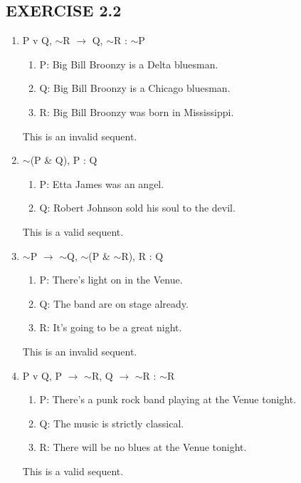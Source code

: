 \documentclass[a4paper,12pt]{article}
\newcommand{\ra}{$\rightarrow$ }
\newcommand{\s}{$\sim$}
\begin{document}
    \subsection*{EXERCISE 2.2}

    \begin{enumerate}[label=\arabic*,leftmargin=*]

        \item P v Q, \s R \ra Q, \s R : \s P
            \nopagebreak
            \begin{enumerate}[label=(\roman*)]
                \item P: Big Bill Broonzy is a Delta bluesman.
                \item Q: Big Bill Broonzy is a Chicago bluesman.
                \item R: Big Bill Broonzy was born in Mississippi.
            \end{enumerate}
            This is an invalid sequent.

        \item \s (P \& Q), P : Q
            \nopagebreak
            \begin{enumerate}[label=(\roman*)]
                \item P: Etta James was an angel.
                \item Q: Robert Johnson sold his soul to the devil.
            \end{enumerate}
            This is a valid sequent.

        \item \s P \ra \s Q, \s (P \& \s R), R : Q
            \nopagebreak
            \begin{enumerate}[label=(\roman*)]
                \item P: There's light on in the Venue.
                \item Q: The band are on stage already.
                \item R: It's going to be a great night.
            \end{enumerate}
            This is an invalid sequent.

        \item P v Q, P \ra \s R, Q \ra \s R : \s R
            \nopagebreak
            \begin{enumerate}[label=(\roman*)]
                \item P: There's a punk rock band playing at the Venue tonight.
                \item Q: The music is strictly classical.
                \item R: There will be no blues at the Venue tonight.
            \end{enumerate}
            This is a valid sequent.


\end{enumerate}
\end{document}
